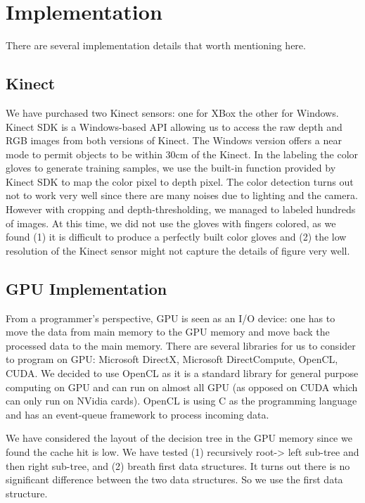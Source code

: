 \section{Implementation}

There are several implementation details that worth mentioning here. 

\subsection{Kinect}
We have purchased two Kinect sensors: one for XBox the other for Windows. Kinect SDK is a Windows-based API allowing us to access the raw depth and RGB images from both versions of Kinect. The Windows version offers a near mode to permit objects to be within 30cm of the Kinect. In the labeling the color gloves to generate training samples, we use the built-in function provided by Kinect SDK to map the color pixel to depth pixel. The color detection turns out not to work very well since there are many noises due to lighting and the camera. However with cropping and depth-thresholding, we managed to labeled hundreds of images. At this time, we did not use the gloves with fingers colored, as we found (1) it is difficult to produce a perfectly built color gloves and (2) the low resolution of the Kinect sensor might not capture the details of figure very well.

\subsection{GPU Implementation}
From a programmer's perspective, GPU is seen as an I/O device: one has to move the data from main memory to the GPU memory and move back the processed data to the main memory. There are several libraries for us to consider to program on GPU: Microsoft DirectX, Microsoft DirectCompute, OpenCL, CUDA. We decided to use OpenCL as it is a standard library for general purpose computing on GPU and can run on almost all GPU (as opposed on CUDA which can only run on NVidia cards). OpenCL is using C as the programming language and has an event-queue framework to process incoming data. 

We have considered the layout of the decision tree in the GPU memory since we found the cache hit is low. We have tested (1) recursively root-> left sub-tree and then right sub-tree, and (2) breath first data structures. It turns out there is no significant difference between the two data structures. So we use the first data structure.  

